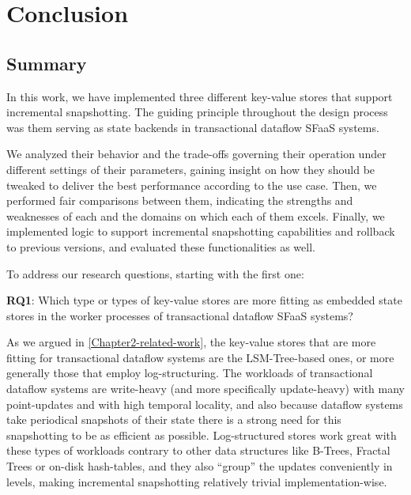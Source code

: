 
\chapter{Conclusion}

\label{Chapter5-conclusion}

\section{Summary}

In this work, we have implemented three different key-value stores that support incremental snapshotting. The guiding principle throughout the design process was them serving as state backends in transactional dataflow SFaaS systems.

We analyzed their behavior and the trade-offs governing their operation under different settings of their parameters, gaining insight on how they should be tweaked to deliver the best performance according to the use case.
Then, we performed fair comparisons between them, indicating the strengths and weaknesses of each and the domains on which each of them excels.
Finally, we implemented logic to support incremental snapshotting capabilities and rollback to previous versions, and evaluated these functionalities as well.

To address our research questions, starting with the first one:

\begin{tcolorbox}
    \textbf{RQ1}: Which type or types of key-value stores are more fitting as embedded state stores in the worker processes of transactional dataflow SFaaS systems?
\end{tcolorbox}

As we argued in \ref{Chapter2-related-work}, the key-value stores that are more fitting for transactional dataflow systems are the LSM-Tree-based ones, or more generally those that employ log-structuring.
The workloads of transactional dataflow systems are write-heavy (and more specifically update-heavy) with many point-updates and with high temporal locality, and also because dataflow systems take periodical snapshots of their state there is a strong need for this snapshotting to be as efficient as possible.
Log-structured stores work great with these types of workloads contrary to other data structures like B-Trees, Fractal Trees or on-disk hash-tables, and they also ``group'' the updates conveniently in levels, making incremental snapshotting relatively trivial implementation-wise.

